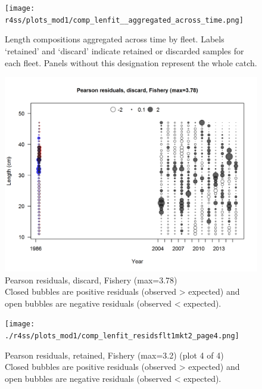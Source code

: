 \documentclass[12pt,]{article}
\begin{document}
\begin{figure}
\centering
\texttt{[image: r4ss/plots\_mod1/comp\_lenfit\_\_aggregated\_across\_time.png]}
\caption{Length compositions aggregated across time by fleet. Labels
`retained' and `discard' indicate retained or discarded samples for each
fleet. Panels without this designation represent the whole catch.
\label{fig:length_agg}}
\end{figure}

\begin{figure}
\centering
\includegraphics{./r4ss/plots_mod1/comp_lenfit_residsflt1mkt1.png}
\caption{Pearson residuals, discard, Fishery (max=3.78)\\
Closed bubbles are positive residuals (observed \textgreater{} expected)
and open bubbles are negative residuals (observed \textless{} expected).
\label{fig:discard_len_pearson}}
\end{figure}

\begin{figure}
\centering
\texttt{[image: ./r4ss/plots\_mod1/comp\_lenfit\_residsflt1mkt2\_page4.png]}
\caption{Pearson residuals, retained, Fishery (max=3.2) (plot 4 of 4)\\
Closed bubbles are positive residuals (observed \textgreater{} expected)
and open bubbles are negative residuals (observed \textless{} expected).
\label{fig:fishery_len_pearson}}
\end{figure}
\end{document}
